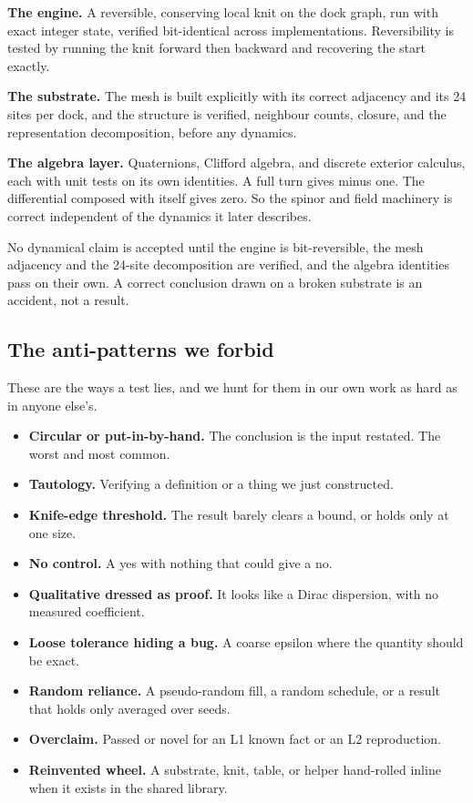 \textbf{The engine.} A reversible, conserving local knit on the dock graph, run with exact integer state, verified bit-identical across implementations. Reversibility is tested by running the knit forward then backward and recovering the start exactly.

\textbf{The substrate.} The mesh is built explicitly with its correct adjacency and its 24 sites per dock, and the structure is verified, neighbour counts, closure, and the representation decomposition, before any dynamics.

\textbf{The algebra layer.} Quaternions, Clifford algebra, and discrete exterior calculus, each with unit tests on its own identities. A full turn gives minus one. The differential composed with itself gives zero. So the spinor and field machinery is correct independent of the dynamics it later describes.

\begin{lemma}
No dynamical claim is accepted until the engine is bit-reversible, the mesh adjacency and the 24-site decomposition are verified, and the algebra identities pass on their own. A correct conclusion drawn on a broken substrate is an accident, not a result.
\end{lemma}

\subsection{The anti-patterns we forbid}

These are the ways a test lies, and we hunt for them in our own work as hard as in anyone else's.

\begin{itemize}
\item \textbf{Circular or put-in-by-hand.} The conclusion is the input restated. The worst and most common.
\item \textbf{Tautology.} Verifying a definition or a thing we just constructed.
\item \textbf{Knife-edge threshold.} The result barely clears a bound, or holds only at one size.
\item \textbf{No control.} A yes with nothing that could give a no.
\item \textbf{Qualitative dressed as proof.} It looks like a Dirac dispersion, with no measured coefficient.
\item \textbf{Loose tolerance hiding a bug.} A coarse epsilon where the quantity should be exact.
\item \textbf{Random reliance.} A pseudo-random fill, a random schedule, or a result that holds only averaged over seeds.
\item \textbf{Overclaim.} Passed or novel for an L1 known fact or an L2 reproduction.
\item \textbf{Reinvented wheel.} A substrate, knit, table, or helper hand-rolled inline when it exists in the shared library.
\end{itemize}

